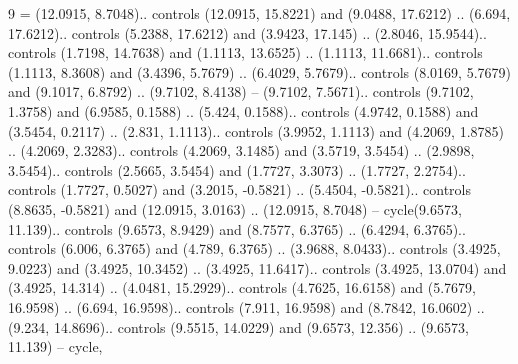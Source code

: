 9 = {(12.0915, 8.7048).. controls (12.0915, 15.8221) and (9.0488, 17.6212) .. (6.694, 17.6212).. controls (5.2388, 17.6212) and (3.9423, 17.145) .. (2.8046, 15.9544).. controls (1.7198, 14.7638) and (1.1113, 13.6525) .. (1.1113, 11.6681).. controls (1.1113, 8.3608) and (3.4396, 5.7679) .. (6.4029, 5.7679).. controls (8.0169, 5.7679) and (9.1017, 6.8792) .. (9.7102, 8.4138) -- (9.7102, 7.5671).. controls (9.7102, 1.3758) and (6.9585, 0.1588) .. (5.424, 0.1588).. controls (4.9742, 0.1588) and (3.5454, 0.2117) .. (2.831, 1.1113).. controls (3.9952, 1.1113) and (4.2069, 1.8785) .. (4.2069, 2.3283).. controls (4.2069, 3.1485) and (3.5719, 3.5454) .. (2.9898, 3.5454).. controls (2.5665, 3.5454) and (1.7727, 3.3073) .. (1.7727, 2.2754).. controls (1.7727, 0.5027) and (3.2015, -0.5821) .. (5.4504, -0.5821).. controls (8.8635, -0.5821) and (12.0915, 3.0163) .. (12.0915, 8.7048) -- cycle(9.6573, 11.139).. controls (9.6573, 8.9429) and (8.7577, 6.3765) .. (6.4294, 6.3765).. controls (6.006, 6.3765) and (4.789, 6.3765) .. (3.9688, 8.0433).. controls (3.4925, 9.0223) and (3.4925, 10.3452) .. (3.4925, 11.6417).. controls (3.4925, 13.0704) and (3.4925, 14.314) .. (4.0481, 15.2929).. controls (4.7625, 16.6158) and (5.7679, 16.9598) .. (6.694, 16.9598).. controls (7.911, 16.9598) and (8.7842, 16.0602) .. (9.234, 14.8696).. controls (9.5515, 14.0229) and (9.6573, 12.356) .. (9.6573, 11.139) -- cycle},